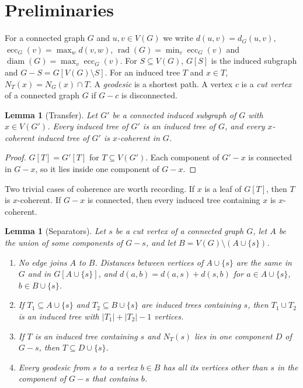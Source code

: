 \documentclass[11pt,a4paper]{article}
\newtheorem{lemma}[theorem]{Lemma}
\theoremstyle{definition}
\newcommand{\rad}{\operatorname{rad}}
\newcommand{\diam}{\operatorname{diam}}
\newcommand{\ecc}{\operatorname{ecc}}
\begin{document}
\section{Preliminaries}\label{sec:prelim}

For a connected graph $G$ and $u,v\in V(G)$ we write $d(u,v)=d_G(u,v)$, $\ecc_G(v)=\max_w d(v,w)$, $\rad(G)=\min_v\ecc_G(v)$ and $\diam(G)=\max_v\ecc_G(v)$. For $S\subseteq V(G)$, $G[S]$ is the induced subgraph and $G-S=G[V(G)\setminus S]$. For an induced tree $T$ and $x\in T$, $N_T(x)=N_G(x)\cap T$. A \emph{geodesic} is a shortest path. A vertex $c$ is a \emph{cut vertex} of a connected graph $G$ if $G-c$ is disconnected.

\begin{lemma}[Transfer]\label{lem:transfer}
Let $G'$ be a connected induced subgraph of $G$ with $x\in V(G')$. Every induced tree of $G'$ is an induced tree of $G$, and every $x$-coherent induced tree of $G'$ is $x$-coherent in $G$.
\end{lemma}

\begin{proof}
$G[T]=G'[T]$ for $T\subseteq V(G')$. Each component of $G'-x$ is connected in $G-x$, so it lies inside one component of $G-x$.
\end{proof}

Two trivial cases of coherence are worth recording. If $x$ is a leaf of $G[T]$, then $T$ is $x$-coherent. If $G-x$ is connected, then every induced tree containing $x$ is $x$-coherent.

\begin{lemma}[Separators]\label{lem:sep}
Let $s$ be a cut vertex of a connected graph $G$, let $A$ be the union of some components of $G-s$, and let $B=V(G)\setminus(A\cup\{s\})$.
\begin{enumerate}[label=\textup{(\alph*)}]
\item No edge joins $A$ to $B$. Distances between vertices of $A\cup\{s\}$ are the same in $G$ and in $G[A\cup\{s\}]$, and $d(a,b)=d(a,s)+d(s,b)$ for $a\in A\cup\{s\}$, $b\in B\cup\{s\}$.
\item If $T_1\subseteq A\cup\{s\}$ and $T_2\subseteq B\cup\{s\}$ are induced trees containing $s$, then $T_1\cup T_2$ is an induced tree with $|T_1|+|T_2|-1$ vertices.
\item If $T$ is an induced tree containing $s$ and $N_T(s)$ lies in one component $D$ of $G-s$, then $T\subseteq D\cup\{s\}$.
\item Every geodesic from $s$ to a vertex $b\in B$ has all its vertices other than $s$ in the component of $G-s$ that contains $b$.
\end{enumerate}
\end{lemma}
\end{document}

